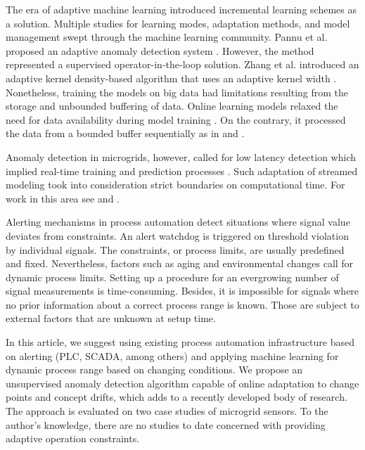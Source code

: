 The era of adaptive machine learning introduced incremental learning schemes as a solution. Multiple studies for learning modes, adaptation methods, and model management swept through the machine learning community. Pannu et al. proposed an adaptive anomaly detection system \cite{Pannu2012}. However, the method represented a supervised operator-in-the-loop solution. Zhang et al. introduced an adaptive kernel density-based algorithm that uses an adaptive kernel width \cite{Zhang201850}. Nonetheless, training the models on big data had limitations resulting from the storage and unbounded buffering of data. Online learning models relaxed the need for data availability during model training \cite{Gama2014}. On the contrary, it processed the data from a bounded buffer sequentially as in \cite{Bosman201514} and \cite{Ahmad2017134}. 

Anomaly detection in microgrids, however, called for low latency detection which implied real-time training and prediction processes \cite{Liu2017}. Such adaptation of streamed modeling took into consideration strict boundaries on computational time. For work in this area see \cite{Wang2020114145} and \cite{Dai2022}.

Alerting mechanisms in process automation detect situations where signal value deviates from constraints. An alert watchdog is triggered on threshold violation by individual signals. The constraints, or process limits, are usually predefined and fixed. Nevertheless, factors such as aging and environmental changes call for dynamic process limits. Setting up a procedure for an evergrowing number of signal measurements is time-consuming. Besides, it is impossible for signals where no prior information about a correct process range is known. Those are subject to external factors that are unknown at setup time. 

In this article, we suggest using existing process automation infrastructure based on alerting (PLC, SCADA, among others) and applying machine learning for dynamic process range based on changing conditions. We propose an unsupervised anomaly detection algorithm capable of online adaptation to change points and concept drifts, which adds to a recently developed body of research. The approach is evaluated on two case studies of microgrid sensors. To the author's knowledge, there are no studies to date concerned with providing adaptive operation constraints.

